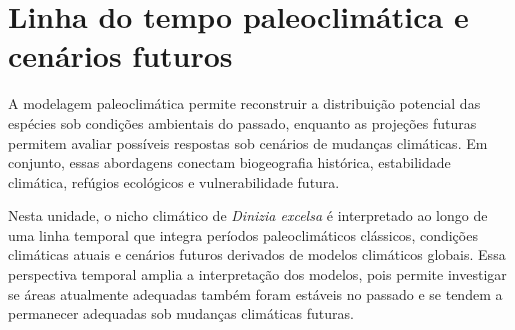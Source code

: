 \documentclass{ueap-sdm}
\begin{document}
\section{Linha do tempo paleoclimática e cenários futuros}

A modelagem paleoclimática permite reconstruir a distribuição potencial das
espécies sob condições ambientais do passado, enquanto as projeções futuras
permitem avaliar possíveis respostas sob cenários de mudanças climáticas. Em
conjunto, essas abordagens conectam biogeografia histórica, estabilidade
climática, refúgios ecológicos e vulnerabilidade futura.

Nesta unidade, o nicho climático de \textit{Dinizia excelsa} é interpretado ao
longo de uma linha temporal que integra períodos paleoclimáticos clássicos,
condições climáticas atuais e cenários futuros derivados de modelos climáticos
globais. Essa perspectiva temporal amplia a interpretação dos modelos, pois
permite investigar se áreas atualmente adequadas também foram estáveis no
passado e se tendem a permanecer adequadas sob mudanças climáticas futuras.
\end{document}
